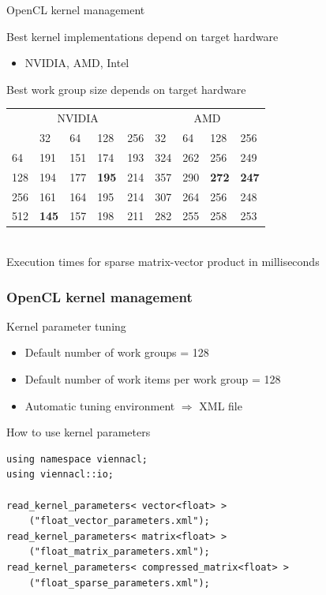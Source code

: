 \begin{frame}{OpenCL kernel management}

\begin{block}{Best kernel implementations depend on target hardware}
  \begin{itemize}
    \item NVIDIA, AMD, Intel
  \end{itemize}
\end{block}

\begin{block}{Best work group size depends on target hardware}
  \vspace{0.3cm}
  \begin{tabular}{l|llll|llll}
    \multicolumn{5}{c}{ \hspace{0.6cm} NVIDIA} & \multicolumn{4}{c}{AMD} \\
    & 32  & 64  & 128 & 256 & 32 & 64 & 128 & 256 \\
    \hline
    64  & 191 & 151 & 174 & 193 & 324 & 262 & 256 & 249 \\
    128 & 194 & 177 & \textbf{195} & 214 & 357 & 290 & \textbf{272} & \textbf{247} \\
    256 & 161 & 164 & 195 & 214 & 307 & 264 & 256 & 248 \\
    512 & \textbf{145} & 157 & 198 & 211 & 282 & 255 & 258 & 253 \\
  \end{tabular}
  \vspace{0.3cm}
  \\Execution times for sparse matrix-vector product in milliseconds
\end{block}

\end{frame}



\begin{frame}[fragile]
\frametitle{OpenCL kernel management}

\begin{block}{Kernel parameter tuning}
  \begin{itemize}
    \item Default number of work groups = 128
    \item Default number of work items per work group = 128
    \item Automatic tuning environment $\Rightarrow$ XML file
  \end{itemize}
\end{block}

\begin{block}{How to use kernel parameters}
\begin{lstlisting}
using namespace viennacl;
using viennacl::io;

read_kernel_parameters< vector<float> >
    ("float_vector_parameters.xml");
read_kernel_parameters< matrix<float> >
    ("float_matrix_parameters.xml");
read_kernel_parameters< compressed_matrix<float> >
    ("float_sparse_parameters.xml");
\end{lstlisting}
\end{block}

\end{frame}




